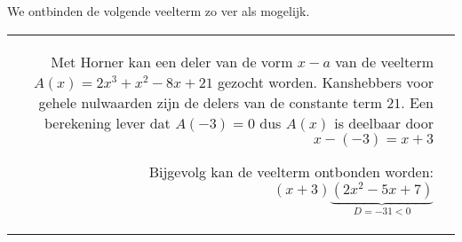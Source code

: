 \documentclass{ximera}
\begin{document}
\begin{example} 
We ontbinden de volgende veelterm zo ver als mogelijk.
\renewcommand{\kolbreed}{\widthof{$-21$}}


\begin{tabular}{rl}

Met Horner kan een deler van de vorm \(x-a\) van de veelterm \(A(x) = 2x^3 + x^2 - 8x + 21\) gezocht worden. Kanshebbers voor gehele nulwaarden zijn de delers van de constante term $21$. Een berekening lever dat \( A(-3) = 0 \) dus $A(x)$ is deelbaar door $x- (-3) = x+3$





Bijgevolg kan de veelterm ontbonden worden: \( (x+3)\underbrace{(2x^2-5x+7)}_{D = -31 < 0} \)
\end{tabular}

\end{example} 
\end{document}
